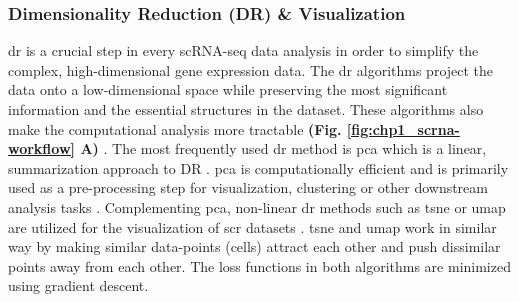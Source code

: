\subsubsection{Dimensionality Reduction (DR) \& Visualization}
\gls{dr} is a crucial step in every scRNA-seq data analysis in order to simplify the complex, high-dimensional gene expression data. The \gls{dr} algorithms project the data onto a low-dimensional space while preserving the most significant information and the essential structures in the dataset. These algorithms also make the computational analysis more tractable \textbf{(Fig. \ref{fig:chp1_scrna-workflow} A)} \textbf{\cite{lueckenmalte_d_current_2019}}. 
The most frequently used \gls{dr} method is \gls{pca} \textbf{\cite{pearson_liii_1901}} which is a linear, summarization approach to DR \textbf{\cite{lueckenmalte_d_current_2019,heumos_best_2023}}. 
\gls{pca} is computationally efficient and is primarily used as a pre-processing step for visualization, clustering or other downstream analysis tasks \textbf{\cite{lueckenmalte_d_current_2019}}. Complementing \gls{pca}, non-linear \gls{dr} methods such as \gls{tsne} \textbf{\cite{maaten_visualizing_2008}} or \gls{umap} \textbf{\cite{mcinnes_umap_2020}} are utilized for the visualization of \gls{scr} datasets \textbf{\cite{lueckenmalte_d_current_2019,heumos_best_2023}}. \gls{tsne} and \gls{umap} work in similar way by making similar data-points (cells) attract each other and push dissimilar points away from each other. The loss functions in both algorithms are minimized using gradient descent. 
